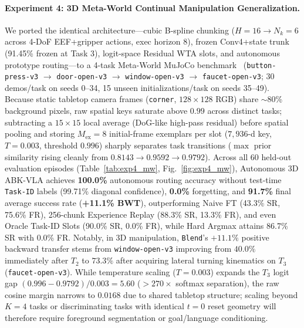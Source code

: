\documentclass[10pt,twocolumn]{article}
\begin{document}
\paragraph{Experiment 4: 3D Meta-World Continual Manipulation Generalization.}
We ported the identical architecture---cubic B-spline chunking ($H=16 \rightarrow N_k=6$ across 4-DoF EEF+gripper actions, exec horizon 8), frozen Conv4+state trunk (91.45\% frozen at Task 3), logit-space Residual WTA slots, and autonomous prototype routing---to a 4-task Meta-World MuJoCo benchmark~\cite{yu2020metaworld} (\texttt{button-press-v3} $\rightarrow$ \texttt{door-open-v3} $\rightarrow$ \texttt{window-open-v3} $\rightarrow$ \texttt{faucet-open-v3}; 30 demos/task on seeds 0--34, 15 unseen initializations/task on seeds 35--49). Because static tabletop camera frames (\texttt{corner}, $128\times 128$ RGB) share $\sim$80\% background pixels, raw spatial keys saturate above $0.99$ across distinct tasks; subtracting a $15\times 15$ local average (DoG-like high-pass residual) before spatial pooling and storing $M_{\text{ex}}=8$ initial-frame exemplars per slot ($7,936$-d key, $T=0.003$, threshold $0.996$) sharply separates task transitions ($\max$ prior similarity rising cleanly from $0.8143 \rightarrow 0.9592 \rightarrow 0.9792$). Across all 60 held-out evaluation episodes (Table~\ref{tab:exp4_mw}, Fig.~\ref{fig:exp4_mw}), Autonomous 3D ABK-VLA achieves \textbf{100.0\%} autonomous routing accuracy without test-time \texttt{Task-ID} labels (99.71\% diagonal confidence), \textbf{0.0\%} forgetting, and \textbf{91.7\%} final average success rate (\textbf{+11.1\% BWT}), outperforming Naive FT (43.3\% SR, 75.6\% FR), 256-chunk Experience Replay (88.3\% SR, 13.3\% FR), and even Oracle Task-ID Slots (90.0\% SR, 0.0\% FR), while Hard Argmax attains 86.7\% SR with 0.0\% FR. Notably, in 3D manipulation, \texttt{Blend}'s $+11.1\%$ positive backward transfer stems from \texttt{window-open-v3} improving from $40.0\%$ immediately after $T_2$ to $73.3\%$ after acquiring lateral turning kinematics on $T_3$ (\texttt{faucet-open-v3}). While temperature scaling ($T=0.003$) expands the $T_3$ logit gap $(0.996 - 0.9792)/0.003 = 5.60$ ($>270\times$ softmax separation), the raw cosine margin narrows to $0.0168$ due to shared tabletop structure; scaling beyond $K=4$ tasks or discriminating tasks with identical $t=0$ reset geometry will therefore require foreground segmentation or goal/language conditioning.
\end{document}
